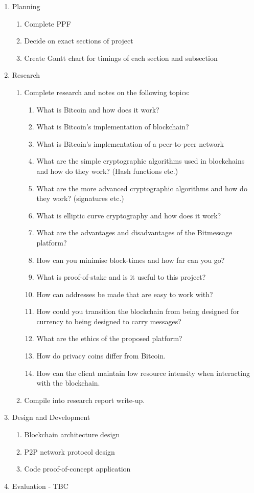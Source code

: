 \documentclass{article}
\begin{document}
\begin{enumerate}
    \item Planning
    \begin{enumerate}
        \item Complete PPF
        \item Decide on exact sections of project
        \item Create Gantt chart for timings of each section and subsection
    \end{enumerate}
    \item Research
    \begin{enumerate}
        \item Complete research and notes on the following topics:
        \begin{enumerate}
            \item What is Bitcoin and how does it work?
            \item What is Bitcoin's implementation of blockchain?
            \item What is Bitcoin's implementation of a peer-to-peer network
            \item What are the simple cryptographic algorithms used in blockchains and how do they work? (Hash functions etc.)
            \item What are the more advanced cryptographic algorithms and how do they work? (signatures etc.)
            \item What is elliptic curve cryptography and how does it work?
            \item What are the advantages and disadvantages of the Bitmessage platform?
            \item How can you minimise block-times and how far can you go?
            \item What is proof-of-stake and is it useful to this project?
            \item How can addresses be made that are easy to work with?
            \item How could you transition the blockchain from being designed for currency to being designed to carry messages?
            \item What are the ethics of the proposed platform?
            \item How do privacy coins differ from Bitcoin.
            \item How can the client maintain low resource intensity when interacting with the blockchain.
        \end{enumerate}
        \item Compile into research report write-up.
    \end{enumerate}
    \item Design and Development
    \begin{enumerate}
        \item Blockchain architecture design
        \item P2P network protocol design
        \item Code proof-of-concept application
    \end{enumerate}
    \item Evaluation - TBC
\end{enumerate}
\end{document}

